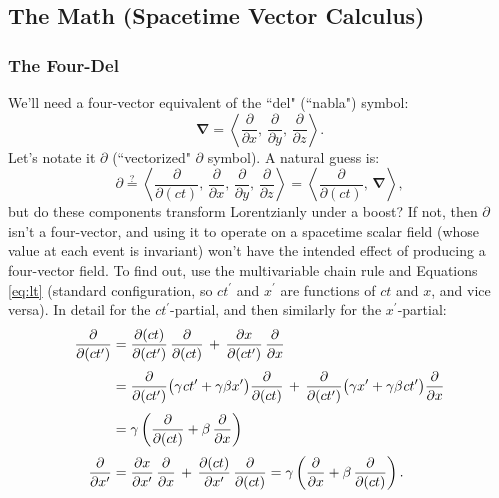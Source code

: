 \documentclass[12pt]{article}
\newcommand{\del}{\boldsymbol{\nabla}}
\begin{document}
\subsection{The Math (Spacetime Vector Calculus)}


\subsubsection{The Four-Del}\label{sssec:fd}

We'll need a four-vector equivalent of the ``del" (``nabla") symbol:
\begin{equation*}
\del = \left \langle \dfrac{\partial}{\partial x}, \, \dfrac{\partial}{\partial y}, \, \dfrac{\partial}{\partial z} \right \rangle .
\end{equation*}
Let's notate it $\partialup$ (``vectorized" $\partial$ symbol). A natural guess is:
\begin{equation*}
\partialup \stackrel{?}{=} \left \langle \dfrac{\partial}{\partial (ct)} , \, \dfrac{\partial}{\partial x}, \, \dfrac{\partial}{\partial y}, \, \dfrac{\partial}{\partial z} \right \rangle = \left \langle \dfrac{\partial}{\partial (ct)} , \, \del \right \rangle ,
\end{equation*}
but do these components transform Lorentzianly under a boost? If not, then $\partialup$ isn't a four-vector, and using it to operate on a spacetime scalar field (whose value at each event is invariant) won't have the intended effect of producing a four-vector field. To find out, use the multivariable chain rule and Equations \ref{eq:lt} (standard configuration, so $ct^\prime$ and $x^\prime$ are functions of $ct$ and $x$, and vice versa). In detail for the $ct^\prime$-partial, and then similarly for the $x^\prime$-partial:
\begin{equation*}
\begin{split}
\dfrac{\partial}{\partial (ct^\prime)} &= \dfrac{\partial (ct)}{\partial (ct^\prime)} \, \dfrac{\partial}{\partial (ct)} \, + \, \dfrac{\partial x}{\partial (ct^\prime)} \, \dfrac{\partial}{\partial x} \\[3pt] &= \dfrac{\partial}{\partial (ct^\prime)} \big( \gamma \mkern1mu ct^\prime + \gamma \beta x^\prime \big) \dfrac{\partial}{\partial (ct)} \, + \, \dfrac{\partial}{\partial (ct^\prime)} \big( \gamma x^\prime + \gamma \beta \mkern1mu ct^\prime \big) \dfrac{\partial}{\partial x} \\[3pt] &= \gamma \left( \dfrac{\partial}{\partial (ct)} + \beta \, \dfrac{\partial}{\partial x} \right) \\[3pt]
\dfrac{\partial}{\partial x^\prime} &= \dfrac{\partial x}{\partial x^\prime} \, \dfrac{\partial}{\partial x} \, + \, \dfrac{\partial (ct)}{\partial x^\prime} \, \dfrac{\partial}{\partial (ct)}  = \gamma \left( \dfrac{\partial}{\partial x} + \beta \, \dfrac{\partial}{\partial (ct)}  \right) .
\end{split}
\end{equation*}
\end{document}
